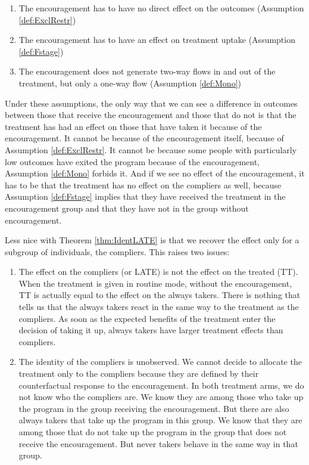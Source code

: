 \documentclass[]{book}
\providecommand{\tightlist}{%
  \setlength{\itemsep}{0pt}\setlength{\parskip}{0pt}}
\theoremstyle{definition}
\theoremstyle{definition}
\theoremstyle{definition}
\theoremstyle{remark}
\let\BeginKnitrBlock\begin \let\EndKnitrBlock\end
\begin{document}
\begin{enumerate}
\def\labelenumi{\arabic{enumi}.}
\tightlist
\item
  The encouragement has to have no direct effect on the outcomes
  (Assumption \ref{def:ExclRestr})
\item
  The encouragement has to have an effect on treatment uptake
  (Assumption \ref{def:Fstage})
\item
  The encouragement does not generate two-way flows in and out of the
  treatment, but only a one-way flow (Assumption \ref{def:Mono})
\end{enumerate}

Under these assumptions, the only way that we can see a difference in
outcomes between those that receive the encouragement and those that do
not is that the treatment has had an effect on those that have taken it
because of the encouragement. It cannot be because of the encouragement
itself, because of Assumption \ref{def:ExclRestr}. It cannot be because
some people with particularly low outcomes have exited the program
because of the encouragement, Assumption \ref{def:Mono} forbids it. And
if we see no effect of the encouragement, it has to be that the
treatment has no effect on the compliers as well, because Assumption
\ref{def:Fstage} implies that they have received the treatment in the
encouragement group and that they have not in the group without
encouragement.

\BeginKnitrBlock{remark}
\iffalse{} {Remark. } \fi{}Less nice with Theorem \ref{thm:IdentLATE} is
that we recover the effect only for a subgroup of individuals, the
compliers. This raises two issues:
\EndKnitrBlock{remark}

\begin{enumerate}
\def\labelenumi{\arabic{enumi}.}
\tightlist
\item
  The effect on the compliers (or LATE) is not the effect on the treated
  (TT). When the treatment is given in routine mode, without the
  encouragement, TT is actually equal to the effect on the always
  takers. There is nothing that tells us that the always takers react in
  the same way to the treatment as the compliers. As soon as the
  expected benefits of the treatment enter the decision of taking it up,
  always takers have larger treatment effects than compliers.
\item
  The identity of the compliers is unobserved. We cannot decide to
  allocate the treatment only to the compliers because they are defined
  by their counterfactual response to the encouragement. In both
  treatment arms, we do not know who the compliers are. We know they are
  among those who take up the program in the group receiving the
  encouragement. But there are also always takers that take up the
  program in this group. We know that they are among those that do not
  take up the program in the group that does not receive the
  encouragement. But never takers behave in the same way in that group.
\end{enumerate}
\end{document}
